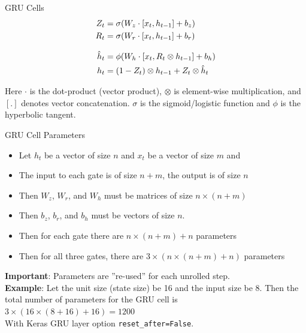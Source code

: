 \documentclass[ignorenonframetext,xcolor=x11names]{beamer}
\begin{document}
\begin{frame}{GRU Cells}
\begin{align*}
Z_t &= \sigma (W_z \cdot [x_t, h_{t-1}] + b_z) \\
R_t &= \sigma (W_r \cdot [x_t, h_{t-1}] + b_r) \\[.5\baselineskip]
\hat{h}_t &= \phi (W_h \cdot [x_t, R_t \otimes h_{t-1}] + b_h) \\
h_t &= (1 - Z_t) \otimes h_{t-1} + Z_t \otimes \hat{h}_t
\end{align*}

\small
Here $\cdot$ is the dot-product (vector product), $\otimes$ is element-wise multiplication, and $[.]$ denotes vector concatenation.  $\sigma$ is the sigmoid/logistic function and $\phi$ is the hyperbolic tangent.
\end{frame}

\begin{frame}{GRU Cell Parameters}
\small
\begin{itemize}
  \item Let $h_t$ be a vector of size $n$ and $x_t$ be a vector of size $m$ and 
  \item The input to each gate is of size $n+m$, the output is of size $n$
  \item Then $W_z$, $W_r$, and $W_h$ must be matrices of size $n \times (n+m)$
  \item Then $b_z$, $b_r$, and $b_h$ must be vectors of size $n$. 
  \item Then for each gate there are $n \times (n+m) + n$ parameters
  \item Then for all three gates, there are $3 \times (n \times (n+m) + n)$ parameters
\end{itemize}
\textbf{Important}: Parameters are ''re-used'' for each unrolled step.\\

\textbf{Example}: Let the unit size (state size) be 16 and the input size be 8. Then the total number of parameters for the GRU cell is $3 \times (16 \times (8+16) + 16) = 1200$ \\
{\tiny With Keras GRU layer option \texttt{reset\_after=False}.}
\end{frame}
\end{document}
